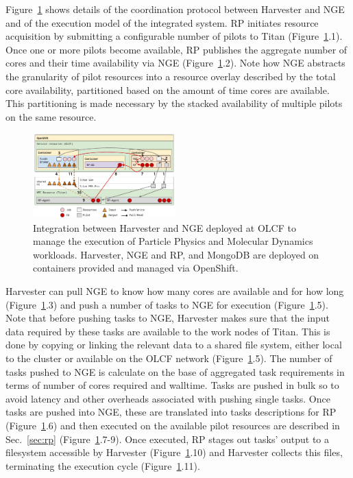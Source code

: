 \documentclass{webofc}
\begin{document}
Figure~\ref{fig:integration} shows details of the coordination protocol
between Harvester and NGE and of the execution model of the integrated
system. RP initiates resource acquisition by submitting a configurable number
of pilots to Titan (Figure~\ref{fig:integration}.1). Once one or more pilots
become available, RP publishes the aggregate number of cores and their time
availability via NGE (Figure~\ref{fig:integration}.2). Note how NGE abstracts
the granularity of pilot resources into a resource overlay described by the
total core availability, partitioned based on the amount of time cores are
available. This partitioning is made necessary by the stacked availability of
multiple pilots on the same resource.

\begin{figure}
  \centering
  \includegraphics[width=0.49\textwidth]{figures/integration.pdf}
  \caption{Integration between Harvester and NGE deployed at OLCF to manage
           the execution of Particle Physics and Molecular Dynamics
           workloads. Harvester, NGE and RP, and MongoDB are deployed on
           containers provided and managed via
           OpenShift.}\label{fig:integration}
\end{figure}

Harvester can pull NGE to know how many cores are available and for how long
(Figure~\ref{fig:integration}.3) and push a number of tasks to NGE for
execution (Figure~\ref{fig:integration}.5). Note that before pushing tasks to
NGE, Harvester makes sure that the input data required by these tasks are
available to the work nodes of Titan. This is done by copying or linking the
relevant data to a shared file system, either local to the cluster or
available on the OLCF network (Figure~\ref{fig:integration}.5).  The number
of tasks pushed to NGE is calculate on the base of aggregated task
requirements in terms of number of cores required and walltime. Tasks are
pushed in bulk so to avoid latency and other overheads associated with
pushing single tasks. Once tasks are pushed into NGE, these are translated
into tasks descriptions for RP (Figure~\ref{fig:integration}.6) and then
executed on the available pilot resources are described in Sec.~\ref{sec:rp}
(Figure~\ref{fig:integration}.7-9). Once executed, RP stages out tasks’
output to a filesystem accessible by Harvester
(Figure~\ref{fig:integration}.10) and Harvester collects this files,
terminating the execution cycle (Figure~\ref{fig:integration}.11).
\end{document}
